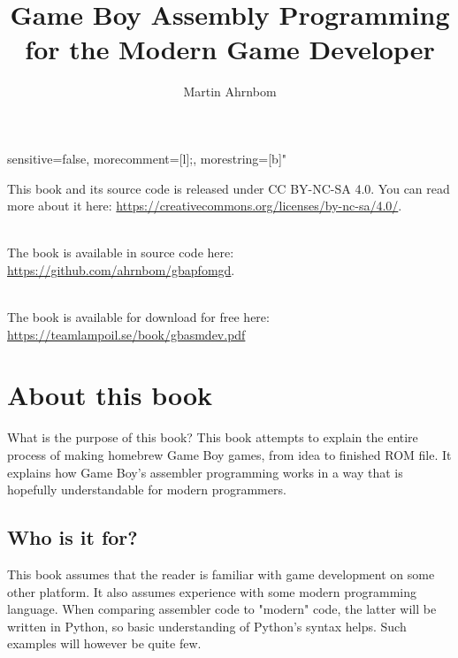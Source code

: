 \documentclass[11pt]{book}
\title{Game Boy Assembly Programming for the Modern Game Developer}
\author{Martin Ahrnbom}
\begin{document}
\maketitle

{
  sensitive=false,
  morecomment=[l]{;}, 
  morestring=[b]" 
}



\lstMakeShortInline{\|}

\noindent \small{This book and its source code is released under CC BY-NC-SA 4.0. You can read more about it here: \url{https://creativecommons.org/licenses/by-nc-sa/4.0/}. 

~\\
\noindent The book is available in source code here: \url{https://github.com/ahrnbom/gbapfomgd}.

~\\
\noindent 
The book is available for download for free here: \url{https://teamlampoil.se/book/gbasmdev.pdf} 
}

\tableofcontents

\chapter{About this book}
What is the purpose of this book?
This book attempts to explain the entire process of making homebrew Game Boy games, from idea to finished ROM file. It explains how Game Boy's assembler programming works in a way that is hopefully understandable for modern programmers. 

\section{Who is it for?}
This book assumes that the reader is familiar with game development on some other platform. It also assumes experience with some modern programming language. When comparing assembler code to "modern" code, the latter will be written in Python, so basic understanding of Python's syntax helps. Such examples will however be quite few.
\end{document}
